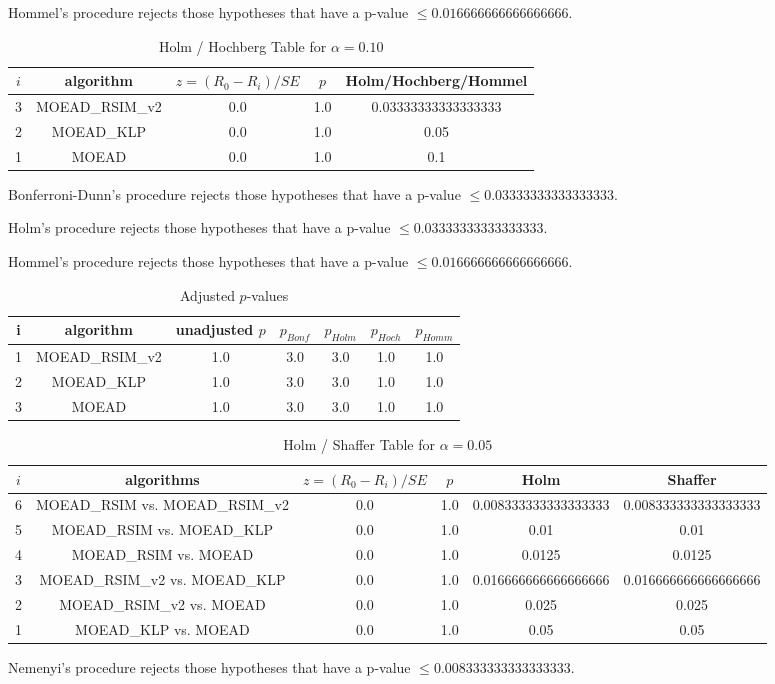 \documentclass[a4paper,10pt]{article}
\begin{document}
\begin{landscape}
Hommel's procedure rejects those hypotheses that have a p-value $\le0.016666666666666666$.


\begin{table}[!htp]
\centering\tiny
\caption{Holm / Hochberg Table for $\alpha=0.10$}
\begin{tabular}{ccccc}
$i$&algorithm&$z=(R_0 - R_i)/SE$&$p$&Holm/Hochberg/Hommel\\
\hline
3&MOEAD_RSIM_v2&0.0&1.0&0.03333333333333333\\
2&MOEAD_KLP&0.0&1.0&0.05\\
1&MOEAD&0.0&1.0&0.1\\
\hline
\end{tabular}
\end{table}
Bonferroni-Dunn's procedure rejects those hypotheses that have a p-value $\le0.03333333333333333$.


Holm's procedure rejects those hypotheses that have a p-value $\le0.03333333333333333$.


Hommel's procedure rejects those hypotheses that have a p-value $\le0.016666666666666666$.


\begin{table}[!htp]
\centering\tiny
\caption{Adjusted $p$-values}
\begin{tabular}{ccccccc}
i&algorithm&unadjusted $p$&$p_{Bonf}$&$p_{Holm}$&$p_{Hoch}$&$p_{Homm}$\\
\hline
1&MOEAD_RSIM_v2&1.0&3.0&3.0&1.0&1.0\\
2&MOEAD_KLP&1.0&3.0&3.0&1.0&1.0\\
3&MOEAD&1.0&3.0&3.0&1.0&1.0\\
\hline
\end{tabular}
\end{table}

\begin{table}[!htp]
\centering\tiny
\caption{Holm / Shaffer Table for $\alpha=0.05$}
\begin{tabular}{cccccc}
$i$&algorithms&$z=(R_0 - R_i)/SE$&$p$&Holm&Shaffer\\
\hline
6&MOEAD_RSIM vs. MOEAD_RSIM_v2&0.0&1.0&0.008333333333333333&0.008333333333333333\\
5&MOEAD_RSIM vs. MOEAD_KLP&0.0&1.0&0.01&0.01\\
4&MOEAD_RSIM vs. MOEAD&0.0&1.0&0.0125&0.0125\\
3&MOEAD_RSIM_v2 vs. MOEAD_KLP&0.0&1.0&0.016666666666666666&0.016666666666666666\\
2&MOEAD_RSIM_v2 vs. MOEAD&0.0&1.0&0.025&0.025\\
1&MOEAD_KLP vs. MOEAD&0.0&1.0&0.05&0.05\\
\hline
\end{tabular}
\end{table}
Nemenyi's procedure rejects those hypotheses that have a p-value $\le0.008333333333333333$.



\end{landscape}
\end{document}
